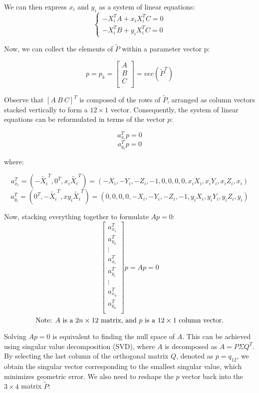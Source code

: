 \documentclass[12pt]{article}
\begin{document}
\noindent We can then express \( x_i \) and \( y_i \) as a system of linear equations:
\[
\left\{
    \begin{array}{l}
        -X_{i}^{T}A + x_{i}X_{i}^{T}C = 0 \\
        -X_{i}^{T}B + y_{i}X_{i}^{T}C = 0
    \end{array}
\right.
\]

\noindent Now, we can collect the elements of \( \tilde{P} \) within a parameter vector p:

\[
p = p_k = 
\begin{bmatrix}
A \\
B \\
C \\
\end{bmatrix} = 
vec(\tilde{P}^T)
\]

\noindent Observe that \( [ A \ B \ C ]^T \) is composed of the rows of \( \tilde{P} \), arranged as column vectors stacked vertically to form a \( 12 \times 1 \) vector. Consequently, the system of linear equations can be reformulated in terms of the vector \( p \):

\[ a_{x_i}^T p = 0 \]
\[ a_{y_i}^T p = 0 \]

\noindent where:

\[
a_{x_i}^T = (-\tilde{X_i}^T, 0^T, x_i \tilde{X_i}^T) = (-X_i, -Y_i, -Z_i, -1, 0, 0, 0, 0, x_i X_i, x_i Y_i, x_i Z_i, x_i)
\]
\[
a_{y_i}^T = (0^T, -\tilde{X_i}^T, xy_i \tilde{X_i}^T) = (0, 0, 0, 0, -X_i, -Y_i, -Z_i, -1, y_i X_i, y_i Y_i, y_i Z_i, y_i)
\]

Now, stacking everything together to formulate \( Ap = 0 \):
\[
\begin{bmatrix}
a_{x_1}^T \\
a_{y_2}^T \\
\vdots \\
a_{x_i}^T \\
a_{y_i}^T \\
\vdots \\
a_{x_n}^T \\
a_{y_n}^T \\
\end{bmatrix} p = Ap = 0
\]
\[
\text{Note: \( A \) is a \( 2n \times 12 \) matrix, and \( p \) is a \( 12 \times 1 \) column vector.}
\]

\noindent Solving \( Ap = 0 \) is equivalent to finding the null space of \( A \). This can be achieved using singular value decomposition (SVD), where \( A \) is decomposed as \( A = P \Sigma Q^T \). By selecting the last column of the orthogonal matrix \( Q \), denoted as \( p = q_{12} \), we obtain the singular vector corresponding to the smallest singular value, which minimizes geometric error. We also need to reshape the \( p \) vector back into the \( 3 \times 4 \) matrix \( \tilde{P} \): 
\end{document}
